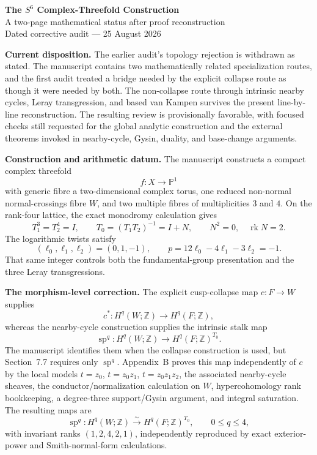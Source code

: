 \documentclass[9pt,letterpaper]{extarticle}
\newcommand{\Z}{\mathbb Z}
\newcommand{\Pone}{\mathbb P^1}
\begin{document}
\begin{center}
{\Large\bfseries The $S^6$ Complex-Threefold Construction}\\[-1pt]
{\large A two-page mathematical status after proof reconstruction}\\[2pt]
{\small Dated corrective audit --- 25 August 2026}
\end{center}

\textbf{Current disposition.}
The earlier audit's topology rejection is withdrawn as stated.  The manuscript contains two mathematically related specialization routes, and the first audit treated a bridge needed by the explicit collapse route as though it were needed by both.  The non-collapse route through intrinsic nearby cycles, Leray transgression, and based van Kampen survives the present line-by-line reconstruction.  The resulting review is provisionally favorable, with focused checks still requested for the global analytic construction and the external theorems invoked in nearby-cycle, Gysin, duality, and base-change arguments.

\textbf{Construction and arithmetic datum.}
The manuscript constructs a compact complex threefold
\[
 f:X\longrightarrow \Pone
\]
with generic fibre a two-dimensional complex torus, one reduced non-normal normal-crossings fibre $W$, and two multiple fibres of multiplicities $3$ and $4$.  On the rank-four lattice, the exact monodromy calculation gives
\[
T_1^3=T_2^4=I,\qquad T_0=(T_1T_2)^{-1}=I+N,\qquad N^2=0,\quad \operatorname{rk}N=2.
\]
The logarithmic twists satisfy
\[
(\ell_0,\ell_1,\ell_2)=(0,1,-1),\qquad
p=12\ell_0-4\ell_1-3\ell_2=-1.
\]
That same integer controls both the fundamental-group presentation and the three Leray transgressions.

\textbf{The morphism-level correction.}
The explicit cusp-collapse map $c:F\to W$ supplies
\[
c^*:H^q(W;\Z)\longrightarrow H^q(F;\Z),
\]
whereas the nearby-cycle construction supplies the intrinsic stalk map
\[
\operatorname{sp}^q:H^q(W;\Z)\longrightarrow H^q(F;\Z)^{T_0}.
\]
The manuscript identifies them when the collapse construction is used, but Section~7.7 requires only $\operatorname{sp}^q$.  Appendix~B proves this map independently of $c$ by the local models $t=z_0$, $t=z_0z_1$, $t=z_0z_1z_2$, the associated nearby-cycle sheaves, the conductor/normalization calculation on $W$, hypercohomology rank bookkeeping, a degree-three support/Gysin argument, and integral saturation.  The resulting maps are
\[
\operatorname{sp}^q:H^q(W;\Z)\xrightarrow{\sim}H^q(F;\Z)^{T_0},\qquad 0\le q\le4,
\]
with invariant ranks $(1,2,4,2,1)$, independently reproduced by exact exterior-power and Smith-normal-form calculations.
\end{document}
